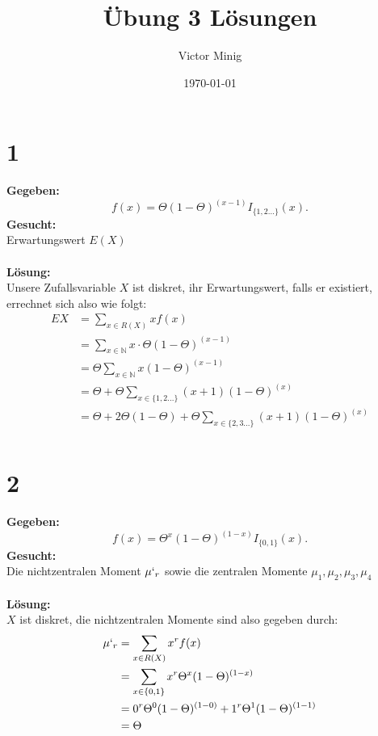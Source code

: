 \documentclass{article}
\begin{document}
\title{Übung 3 Lösungen}
\author{Victor Minig}
\date{\today}
\maketitle

\section*{1}
\textbf{Gegeben:}
\[f(x) = \Theta(1-\Theta)^{(x-1)}I_{\{1,2...\}}(x).\]
\textbf{Gesucht:} \\

Erwartungswert $E(X)$ \\ \\
\textbf{Lösung:} \\

Unsere Zufallsvariable $X$ ist diskret, ihr Erwartungswert, falls er existiert, errechnet sich also wie folgt: 
\begin{align*}
    EX &= \sum_{x\in R(X)}x f(x) \\
    &= \sum_{x \in \mathbb{N}} x \cdot \Theta(1-\Theta)^{(x-1)} \\
    &= \Theta\sum_{x\in \mathbb{N}} x(1- \Theta)^{(x-1)} \\
    &= \Theta + \Theta \sum_{x\in \{1,2...\}} (x+1)(1- \Theta)^{(x)} \\
    &= \Theta + 2 \Theta (1-\Theta) + \Theta \sum_{x\in \{2,3...\}} (x+1)(1- \Theta)^{(x)} \\
\end{align*}


\section*{2}
\textbf{Gegeben:}
\[f(x) = \Theta^x(1-\Theta)^{(1-x)}I_{\{0,1\}}(x).\]
\textbf{Gesucht:} \\

Die nichtzentralen Moment $\mu`_r$ sowie die zentralen Momente $\mu_1, \mu_2, \mu_3, \mu_4$ \\ \\
\textbf{Lösung:}\\

$X$ ist diskret, die nichtzentralen Momente sind also gegeben durch:
\begin{align*}
    \mu`_r &= \sum_{x \in R(X)}x^r f(x) \\
    &= \sum_{x \in \{0,1\}} x^r \Theta^x(1-\Theta)^{(1-x)} \\
    &= 0^r\Theta^0 (1- \Theta)^{(1-0)} + 1^r\Theta^1 (1- \Theta)^{(1-1)} \\
    &= \Theta
\end{align*}
\end{document}
